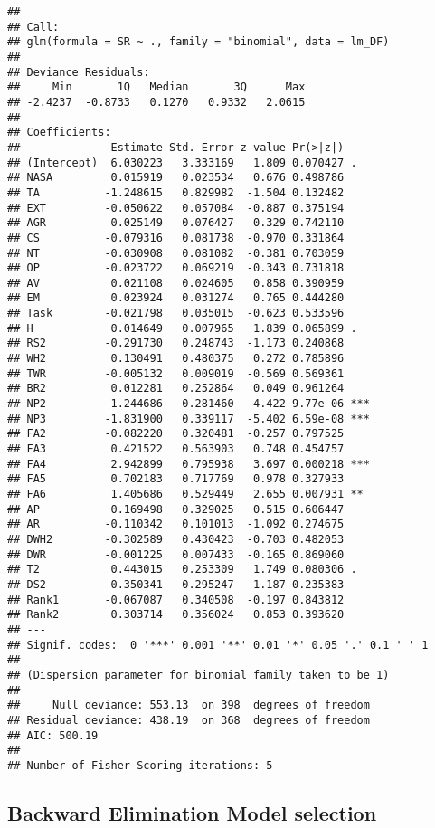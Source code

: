 \documentclass[]{article}
\begin{document}
\begin{verbatim}
## 
## Call:
## glm(formula = SR ~ ., family = "binomial", data = lm_DF)
## 
## Deviance Residuals: 
##     Min       1Q   Median       3Q      Max  
## -2.4237  -0.8733   0.1270   0.9332   2.0615  
## 
## Coefficients:
##              Estimate Std. Error z value Pr(>|z|)    
## (Intercept)  6.030223   3.333169   1.809 0.070427 .  
## NASA         0.015919   0.023534   0.676 0.498786    
## TA          -1.248615   0.829982  -1.504 0.132482    
## EXT         -0.050622   0.057084  -0.887 0.375194    
## AGR          0.025149   0.076427   0.329 0.742110    
## CS          -0.079316   0.081738  -0.970 0.331864    
## NT          -0.030908   0.081082  -0.381 0.703059    
## OP          -0.023722   0.069219  -0.343 0.731818    
## AV           0.021108   0.024605   0.858 0.390959    
## EM           0.023924   0.031274   0.765 0.444280    
## Task        -0.021798   0.035015  -0.623 0.533596    
## H            0.014649   0.007965   1.839 0.065899 .  
## RS2         -0.291730   0.248743  -1.173 0.240868    
## WH2          0.130491   0.480375   0.272 0.785896    
## TWR         -0.005132   0.009019  -0.569 0.569361    
## BR2          0.012281   0.252864   0.049 0.961264    
## NP2         -1.244686   0.281460  -4.422 9.77e-06 ***
## NP3         -1.831900   0.339117  -5.402 6.59e-08 ***
## FA2         -0.082220   0.320481  -0.257 0.797525    
## FA3          0.421522   0.563903   0.748 0.454757    
## FA4          2.942899   0.795938   3.697 0.000218 ***
## FA5          0.702183   0.717769   0.978 0.327933    
## FA6          1.405686   0.529449   2.655 0.007931 ** 
## AP           0.169498   0.329025   0.515 0.606447    
## AR          -0.110342   0.101013  -1.092 0.274675    
## DWH2        -0.302589   0.430423  -0.703 0.482053    
## DWR         -0.001225   0.007433  -0.165 0.869060    
## T2           0.443015   0.253309   1.749 0.080306 .  
## DS2         -0.350341   0.295247  -1.187 0.235383    
## Rank1       -0.067087   0.340508  -0.197 0.843812    
## Rank2        0.303714   0.356024   0.853 0.393620    
## ---
## Signif. codes:  0 '***' 0.001 '**' 0.01 '*' 0.05 '.' 0.1 ' ' 1
## 
## (Dispersion parameter for binomial family taken to be 1)
## 
##     Null deviance: 553.13  on 398  degrees of freedom
## Residual deviance: 438.19  on 368  degrees of freedom
## AIC: 500.19
## 
## Number of Fisher Scoring iterations: 5
\end{verbatim}

\newpage

\hypertarget{backward-elimination-model-selection}{%
\subsection{Backward Elimination Model
selection}\label{backward-elimination-model-selection}}
\end{document}
